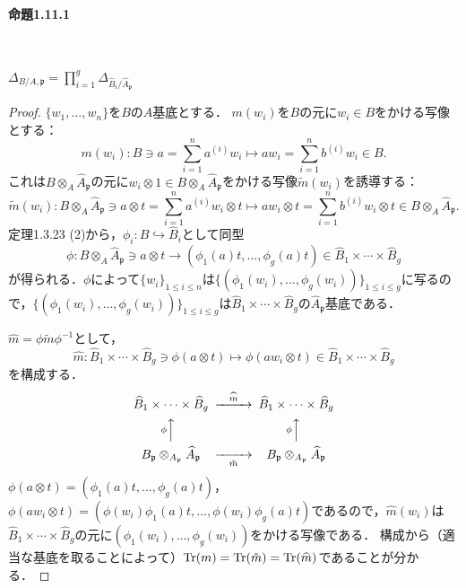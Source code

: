 \paragraph{命題1.11.1}~
\begin{screen}
  $\varDelta_{B/A,\mathfrak{p}}=\prod_{i=1}^g\varDelta_{\widehat{B}_i/\widehat{A}_\mathfrak{p}}$
\end{screen}
\begin{proof}
  $\{w_1, \ldots, w_n\}$を$B$の$A$基底とする．
  $m(w_i)$を$B$の元に$w_i \in B$をかける写像とする：
  \[m(w_i) \colon B \ni a = \sum_{i=1}^n a^{(i)}w_i \mapsto aw_i = \sum_{i=1}^n b^{(i)}w_i \in B.\]
  これは$B \otimes_A \widehat{A}_\mathfrak{p}$の元に$w_i \otimes 1 \in B \otimes_A \widehat{A}_\mathfrak{p}$をかける写像$\tilde{m}(w_i)$を誘導する：
  \[\tilde{m}(w_i) \colon B \otimes_A \widehat{A}_\mathfrak{p} \ni a \otimes t = \sum_{i=1}^n a^{(i)}w_i \otimes t \mapsto aw_i \otimes t = \sum_{i=1}^n b^{(i)}w_i \otimes t \in B \otimes_A \widehat{A}_\mathfrak{p}.\]
  定理1.3.23 (2)から，$\phi_i\colon B\hookrightarrow\widehat{B}_i$として同型
  \[\phi\colon B \otimes_A \widehat{A}_\mathfrak{p} \ni a\otimes t\rightarrow(\phi_1(a)t, \ldots, \phi_g(a)t) \in \widehat{B}_1 \times \cdots \times \widehat{B}_g\]
  が得られる．$\phi$によって$\{w_i\}_{1 \leq i \leq n}$は$\{(\phi_1(w_i), \ldots, \phi_g(w_i))\}_{1 \leq i \leq g}$に写るので，$\{(\phi_1(w_i), \ldots, \phi_g(w_i))\}_{1 \leq i \leq g}$は$\widehat{B}_1 \times \cdots \times \widehat{B}_g$の$\widehat{A}_\mathfrak{p}$基底である．

  $\widehat{m}=\phi \tilde{m} \phi^{-1}$として，
  \[\widehat{m} \colon \widehat{B}_1\times\cdots\times\widehat{B}_g \ni \phi(a \otimes t) \mapsto \phi(aw_i \otimes t) \in \widehat{B}_1\times\cdots\times\widehat{B}_g\]
  を構成する．
  \[
  \begin{CD}
    \widehat{B}_1\times\cdots\times\widehat{B}_g @>{\widehat{m}}>> \widehat{B}_1\times\cdots\times\widehat{B}_g\\
    @A{\phi}AA  @A{\phi}AA\\
    B_\mathfrak{p}\otimes_{A_\mathfrak{p}}\widehat{A}_\mathfrak{p} @>>{\tilde{m}}> B_\mathfrak{p}\otimes_{A_\mathfrak{p}}\widehat{A}_\mathfrak{p}\\
  \end{CD}
  \]
  $\phi(a \otimes t)=(\phi_1(a)t, \ldots, \phi_g(a)t)$，$\phi(aw_i \otimes t)=(\phi(w_i)\phi_1(a)t, \ldots, \phi(w_i)\phi_g(a)t)$であるので，$\widehat{m}(w_i)$は$\widehat{B}_1\times\cdots\times\widehat{B}_g$の元に$(\phi_1(w_i), \ldots, \phi_g(w_i))$をかける写像である．
  構成から（適当な基底を取ることによって）$\operatorname{Tr}(m)=\operatorname{Tr}(\tilde{m})=\operatorname{Tr}(\widehat{m})$であることが分かる．


\end{proof}
